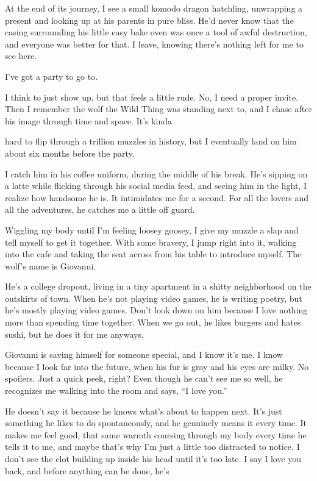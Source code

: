 At the end of its journey, I see a small komodo dragon hatchling,
unwrapping a present and looking up at his parents in pure bliss. He'd
never know that the casing surrounding his little easy bake oven was
once a tool of awful destruction, and everyone was better for that. I
leave, knowing there's nothing left for me to see here.

I've got a party to go to.

I think to just show up, but that feels a little rude. No, I need a
proper invite. Then I remember the wolf the Wild Thing was standing next
to, and I chase after his image through time and space. It's kinda

hard to flip through a trillion muzzles in history, but I eventually
land on him about six months before the party.

I catch him in his coffee uniform, during the middle of his break. He's
sipping on a latte while flicking through his social media feed, and
seeing him in the light, I realize how handsome he is. It intimidates me
for a second. For all the lovers and all the adventures, he catches me a
little off guard.

Wiggling my body until I'm feeling loosey goosey, I give my muzzle a
slap and tell myself to get it together. With some bravery, I jump right
into it, walking into the cafe and taking the seat across from his table
to introduce myself. The wolf's name is Giovanni.

He's a college dropout, living in a tiny apartment in a shitty
neighborhood on the outskirts of town. When he's not playing video
games, he is writing poetry, but he's mostly playing video games. Don't
look down on him because I love nothing more than spending time
together. When we go out, he likes burgers and hates sushi, but he does
it for me anyways.

Giovanni is saving himself for someone special, and I know it's me. I
know because I look far into the future, when his fur is gray and his
eyes are milky. No spoilers. Just a quick peek, right? Even though he
can't see me so well, he recognizes me walking into the room and says,
``I love you.''

He doesn't say it because he knows what's about to happen next. It's
just something he likes to do spontaneously, and he genuinely means it
every time. It makes me feel good, that same warmth coursing through my
body every time he tells it to me, and maybe that's why I'm just a
little too distracted to notice. I don't see the clot building up inside
his head until it's too late. I say I love you back, and before anything
can be done, he's

